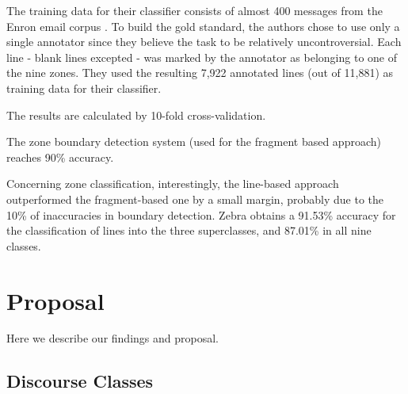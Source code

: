 \documentclass[11pt]{article}
\begin{document}
The training data for their classifier consists of almost 400 messages from the Enron email corpus \cite{klimt2004enron}. To build the gold standard, the authors chose to use only a single annotator since they believe the task to be relatively uncontroversial. Each line - blank lines excepted - was marked by the annotator as belonging to one of the nine zones. They used the resulting 7,922 annotated lines (out of 11,881) as training data for their classifier.

The results are calculated by 10-fold cross-validation. 

The zone boundary detection system (used for the fragment based approach) reaches 90\% accuracy.

Concerning zone classification, interestingly, the line-based approach outperformed the fragment-based one by a small margin, probably due to the 10\% of inaccuracies in boundary detection. Zebra obtains a 91.53\% accuracy for the classification of lines into the three superclasses, and 87.01\% in all nine classes.

\section{Proposal}

Here we describe our findings and proposal.

\subsection{Discourse Classes}
\end{document}

